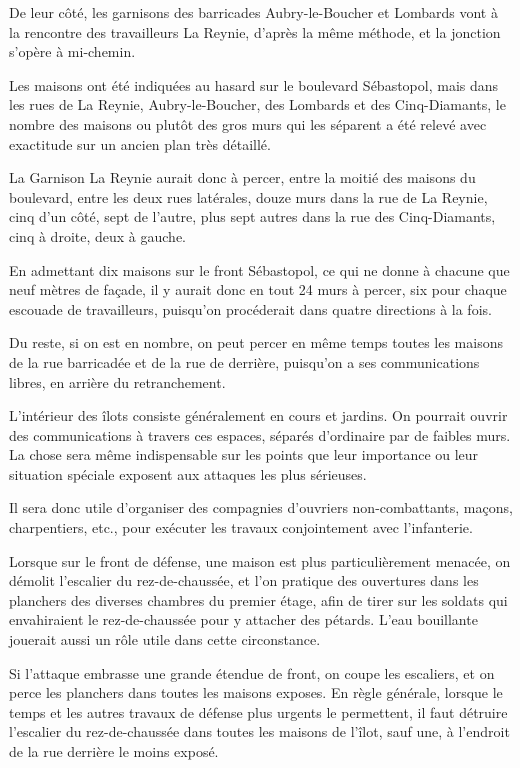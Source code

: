 \documentclass[french,twoside]{book} %
\begin{document}
De leur côté, les garnisons des barricades Aubry-le-Boucher et Lombards vont à la rencontre des travailleurs La Reynie, d’après la même méthode, et la jonction s’opère à mi-chemin.\par
Les maisons ont été indiquées au hasard sur le boulevard Sébastopol, mais dans les rues de La Reynie, Aubry-le-Boucher, des Lombards et des Cinq-Diamants, le nombre des maisons ou plutôt des gros murs qui les séparent a été relevé avec exactitude sur un ancien plan très détaillé.\par
La Garnison La Reynie aurait donc à percer, entre la moitié des maisons du boulevard, entre les deux rues latérales, douze murs dans la rue de La Reynie, cinq d’un côté, sept de l’autre, plus sept autres dans la rue des Cinq-Diamants, cinq à droite, deux à gauche.\par
En admettant dix maisons sur le front Sébastopol, ce qui ne donne à chacune que neuf mètres de façade, il y aurait donc en tout 24 murs à percer, six pour chaque escouade de travailleurs, puisqu’on procéderait dans quatre directions à la fois.\par
Du reste, si on est en nombre, on peut percer en même temps toutes les maisons de la rue barricadée et de la rue de derrière, puisqu’on a ses communications libres, en arrière du retranchement.\par
L'intérieur des îlots consiste généralement en cours et jardins. On pourrait ouvrir des communications à travers ces espaces, séparés d’ordinaire par de faibles murs. La chose sera même indispensable sur les points que leur importance ou leur situation spéciale exposent aux attaques les plus sérieuses.\par
Il sera donc utile d’organiser des compagnies d’ouvriers non-combattants, maçons, charpentiers, etc., pour exécuter les travaux conjointement avec l’infanterie.\par
Lorsque sur le front de défense, une maison est plus particulièrement menacée, on démolit l’escalier du rez-de-chaussée, et l’on pratique des ouvertures dans les planchers des diverses chambres du premier étage, afin de tirer sur les soldats qui envahiraient le rez-de-chaussée pour y attacher des pétards. L'eau bouillante jouerait aussi un rôle utile dans cette circonstance.\par
Si l’attaque embrasse une grande étendue de front, on coupe les escaliers, et on perce les planchers dans toutes les maisons exposes. En règle générale, lorsque le temps et les autres travaux de défense plus urgents le permettent, il faut détruire l’escalier du rez-de-chaussée dans toutes les maisons de l’îlot, sauf une, à l’endroit de la rue derrière le moins exposé.\par
\end{document}
